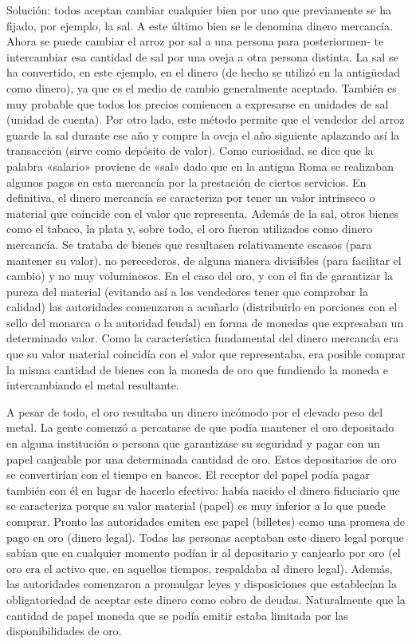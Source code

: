 \documentclass[
]{krantz}
\begin{document}
Solución: todos aceptan cambiar cualquier bien por uno que previamente se ha ﬁjado, por ejemplo, la sal. A este último bien se le denomina dinero mercancía. Ahora se puede cambiar el arroz por sal a una persona para posteriormen- te intercambiar esa cantidad de sal por una oveja a otra persona distinta. La sal se ha convertido, en este ejemplo, en el dinero (de hecho se utilizó en la antigüedad como dinero), ya que es el medio de cambio generalmente aceptado. También es muy probable que todos los precios comiencen a expresarse en unidades de sal (unidad de cuenta). Por otro lado, este método permite que el vendedor del arroz guarde la sal durante ese año y compre la oveja el año siguiente aplazando así la transacción (sirve como depósito de valor). Como curiosidad, se dice que la palabra «salario» proviene de «sal» dado que en la antigua Roma se realizaban algunos pagos en esta mercancía por la prestación de ciertos servicios. En deﬁnitiva, el dinero mercancía se caracteriza por tener un valor intrínseco o material que coincide con el valor que representa. Además de la sal, otros bienes como el tabaco, la plata y, sobre todo, el oro fueron utilizados como dinero mercancía. Se trataba de bienes que resultasen relativamente escasos (para mantener su valor), no perecederos, de alguna manera divisibles (para facilitar el cambio) y no muy voluminosos. En el caso del oro, y con el ﬁn de garantizar la pureza del material (evitando así a los vendedores tener que comprobar la calidad) las autoridades comenzaron a acuñarlo (distribuirlo en porciones con el sello del monarca o la autoridad feudal) en forma de monedas que expresaban un determinado valor. Como la característica fundamental del dinero mercancía era que su valor material coincidía con el valor que representaba, era posible comprar la misma cantidad de bienes con la moneda de oro que fundiendo la moneda e intercambiando el metal resultante.

A pesar de todo, el oro resultaba un dinero incómodo por el elevado peso del metal. La gente comenzó a percatarse de que podía mantener el oro depositado en alguna institución o persona que garantizase su seguridad y pagar con un papel canjeable por una determinada cantidad de oro. Estos depositarios de oro se convertirían con el tiempo en bancos. El receptor del papel podía pagar también con él en lugar de hacerlo efectivo: había nacido el dinero ﬁduciario que se caracteriza porque su valor material (papel) es muy inferior a lo que puede comprar. Pronto las autoridades emiten ese papel (billetes) como una promesa de pago en oro (dinero legal). Todas las personas aceptaban este dinero legal porque sabían que en cualquier momento podían ir al depositario y canjearlo por oro (el oro era el activo que, en aquellos tiempos, respaldaba al dinero legal). Además, las autoridades comenzaron a promulgar leyes y disposiciones que establecían la obligatoriedad de aceptar este dinero como cobro de deudas. Naturalmente que la cantidad de papel moneda que se podía emitir estaba limitada por las disponibilidades de oro.
\end{document}
